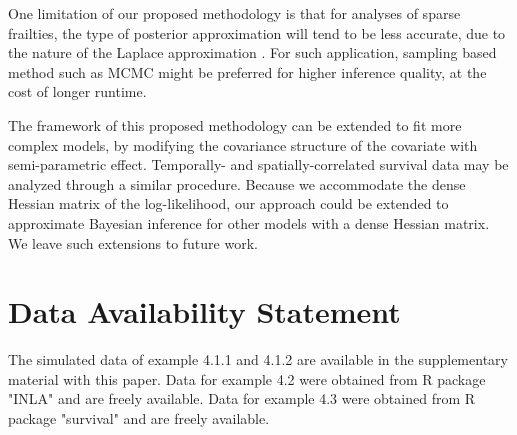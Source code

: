 \documentclass[ba]{imsart}
\begin{document}
One limitation of our proposed methodology is that for analyses of sparse frailties, the type of posterior approximation will tend to be less accurate, due to the nature of the Laplace approximation \citep{Ogden2013ASR}. For such application, sampling based method such as MCMC might be preferred for higher inference quality, at the cost of longer runtime. 

The framework of this proposed methodology can be extended to fit more complex models, by modifying the covariance structure of the covariate with semi-parametric effect. Temporally- and spatially-correlated survival data may be analyzed through a similar procedure. Because we accommodate the dense Hessian matrix of the log-likelihood, our approach could be extended to approximate Bayesian inference for other models with a dense Hessian matrix. We leave such extensions to future work.

\section*{Data Availability Statement}
The simulated data of example 4.1.1 and 4.1.2 are available in the supplementary material with this paper. Data for example 4.2 were obtained from R package "INLA" \citep{inla} and are freely available.
Data for example 4.3 were obtained from R package "survival" \citep{survival-package} and are freely available. 


\nocite{*}%

%

\clearpage

\begin{table}
\begin{center}
\end{center}
\caption{Comparison metrics in terms of MSE and posterior coverage rate from 300 independent replications, for the fixed effect parameter in the first simulation study in section \ref{subsubsec:sim1}.}
\label{table:Sim1AggFixed}
\end{table}
\end{document}
